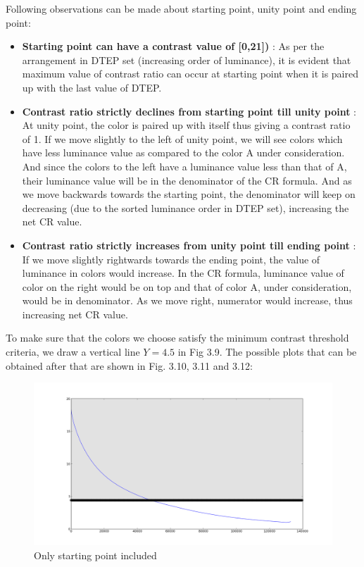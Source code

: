 Following observations can be made about starting point, unity point and ending point:
\begin{itemize}
\item{\textbf{Starting point can have a contrast value of [0,21])}} : As per the arrangement in DTEP set (increasing order of luminance), it is evident that maximum value of contrast ratio can occur at starting point when it is paired up with the last value of DTEP. 
\item {\textbf{Contrast ratio strictly declines from starting point till unity point}} : At unity point, the color is paired up with itself thus giving a contrast ratio of 1. If we move slightly to the left of unity point, we will see colors which have less luminance value as compared to the color A under consideration. And since the colors to the left have a luminance value less than that of A, their luminance value will be in the denominator of the CR formula. And as we move backwards towards the starting point, the denominator will keep on decreasing (due to the sorted luminance order in DTEP set), increasing the net CR value. 
\item{\textbf{Contrast ratio strictly increases from unity point till ending point}} : If we move slightly rightwards towards the ending point, the value of luminance in colors would increase. In the CR formula, luminance value of color on the right would be on top and that of color A, under consideration, would be in denominator. As we move right, numerator would increase, thus increasing net CR value. 
\end{itemize}



To make sure that the colors we choose satisfy the minimum contrast threshold criteria, we draw a vertical line $Y=4.5$ in Fig 3.9. The possible plots that can be obtained after that are shown in Fig. 3.10, 3.11 and 3.12:

\begin{figure}[!htb]
\centering
\includegraphics[width=\linewidth]{CR1.png}
\caption{Only starting point included}
\label{fig:sub1}
\end{figure}

